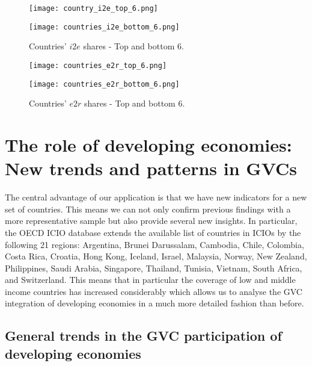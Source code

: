 \documentclass[11pt,a4paper]{article}
\begin{document}
\begin{figure}[h]
\centering
\begin{minipage}{0.45\textwidth}
\centering
\texttt{[image: country\_i2e\_top\_6.png]}
\end{minipage}\hfill
\begin{minipage}{0.45\textwidth}
\centering
\texttt{[image: countries\_i2e\_bottom\_6.png]}
\end{minipage}
\caption{Countries' $i2e$ shares - Top and bottom 6.}
\label{fig:i2e_k}
\end{figure}

\begin{figure}[h]
\centering
\begin{minipage}{0.45\textwidth}
\centering
\texttt{[image: countries\_e2r\_top\_6.png]}
\end{minipage}\hfill
\begin{minipage}{0.45\textwidth}
\centering
\texttt{[image: countries\_e2r\_bottom\_6.png]}
\end{minipage}
\caption{Countries' $e2r$ shares - Top and bottom 6.}
\label{fig:e2r_k}
\end{figure}



\section{The role of developing economies: New trends and patterns in GVCs}\label{sec:news}

The central advantage of our application is that we have new indicators for a new set of countries. This means we can not only confirm previous findings with a more representative sample but also provide several new insights. In particular, the OECD ICIO database extends the available list of countries in ICIOs by the following 21 regions: Argentina, Brunei Darussalam, Cambodia, Chile, Colombia, Costa Rica, Croatia, Hong Kong, Iceland, Israel, Malaysia, Norway, New Zealand, Philippines, Saudi Arabia, Singapore, Thailand, Tunisia, Vietnam, South Africa, and Switzerland. This means that in particular the coverage of low and middle income countries has increased considerably which allows us to analyse the GVC integration of developing economies in a much more detailed fashion than before.


\subsection{General trends in the GVC participation of developing economies}
\end{document}
